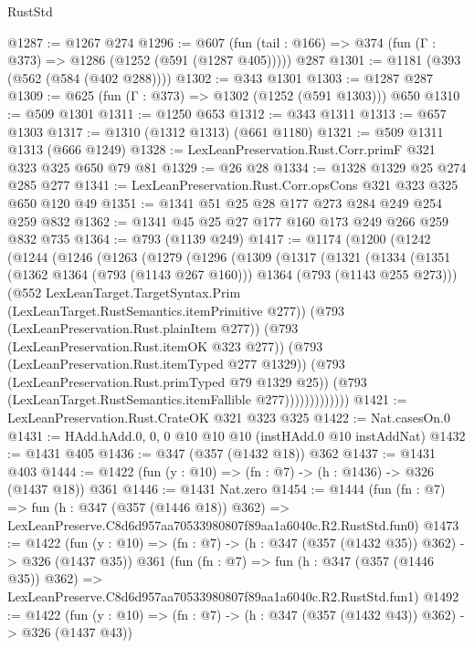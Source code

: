 \begin{lexlean}{RustStd}
\begin{coremodule}
@1287 := @1267 @274
@1296 := @607 (fun (tail : @166) => @374 (fun (Γ : @373) => @1286 (@1252 (@591 (@1287 @405))))) @287
@1301 := @1181 (@393 (@562 (@584 (@402 @288))))
@1302 := @343 @1301
@1303 := @1287 @287
@1309 := @625 (fun (Γ : @373) => @1302 (@1252 (@591 @1303))) @650
@1310 := @509 @1301
@1311 := @1250 @653
@1312 := @343 @1311
@1313 := @657 @1303
@1317 := @1310 (@1312 @1313) (@661 @1180)
@1321 := @509 @1311 @1313 (@666 @1249)
@1328 := LexLeanPreservation.Rust.Corr.primF @321 @323 @325 @650 @79 @81
@1329 := @26 @28
@1334 := @1328 @1329 @25 @274 @285 @277
@1341 := LexLeanPreservation.Rust.Corr.opsCons @321 @323 @325 @650 @120 @49
@1351 := @1341 @51 @25 @28 @177 @273 @284 @249 @254 @259 @832
@1362 := @1341 @45 @25 @27 @177 @160 @173 @249 @266 @259 @832 @735
@1364 := @793 (@1139 @249)
@1417 := @1174
    (@1200
      (@1242
        (@1244
          (@1246
            (@1263
              (@1279
                (@1296
                  (@1309
                    (@1317
                      (@1321
                        (@1334
                          (@1351
                            (@1362 @1364 (@793 (@1143 @267 @160)))
                            @1364
                            (@793 (@1143 @255 @273)))
                          (@552
                            LexLeanTarget.TargetSyntax.Prim
                            (LexLeanTarget.RustSemantics.itemPrimitive @277))
                          (@793 (LexLeanPreservation.Rust.plainItem @277))
                          (@793 (LexLeanPreservation.Rust.itemOK @323 @277))
                          (@793 (LexLeanPreservation.Rust.itemTyped @277 @1329))
                          (@793 (LexLeanPreservation.Rust.primTyped @79 @1329 @25))
                          (@793 (LexLeanTarget.RustSemantics.itemFallible @277)))))))))))))
@1421 := LexLeanPreservation.Rust.CrateOK @321 @323 @325
@1422 := Nat.casesOn.{0}
@1431 := HAdd.hAdd.{0, 0, 0} @10 @10 @10 (instHAdd.{0} @10 instAddNat)
@1432 := @1431 @405
@1436 := @347 (@357 (@1432 @18)) @362
@1437 := @1431 @403
@1444 := @1422 (fun (y : @10) => (fn : @7) -> (h : @1436) -> @326 (@1437 @18)) @361
@1446 := @1431 Nat.zero
@1454 := @1444
    (fun (fn : @7) =>
    fun (h : @347 (@357 (@1446 @18)) @362) =>
    LexLeanPreserve.C8d6d957aa70533980807f89aa1a6040c.R2.RustStd.fun0)
@1473 := @1422
    (fun (y : @10) => (fn : @7) -> (h : @347 (@357 (@1432 @35)) @362) -> @326 (@1437 @35))
    @361
    (fun (fn : @7) =>
    fun (h : @347 (@357 (@1446 @35)) @362) =>
    LexLeanPreserve.C8d6d957aa70533980807f89aa1a6040c.R2.RustStd.fun1)
@1492 := @1422
    (fun (y : @10) => (fn : @7) -> (h : @347 (@357 (@1432 @43)) @362) -> @326 (@1437 @43))

\end{coremodule}
\end{lexlean}
